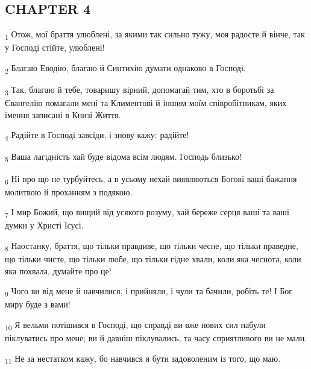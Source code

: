 \subsection{CHAPTER 4}
\begin{tcolorbox}
\textsubscript{1} Отож, мої браття улюблені, за якими так сильно тужу, моя радосте й вінче, так у Господі стійте, улюблені!
\end{tcolorbox}
\begin{tcolorbox}
\textsubscript{2} Благаю Еводію, благаю й Синтихію думати однаково в Господі.
\end{tcolorbox}
\begin{tcolorbox}
\textsubscript{3} Так, благаю й тебе, товаришу вірний, допомагай тим, хто в боротьбі за Євангелію помагали мені та Климентові й іншим моїм співробітникам, яких імення записані в Книзі Життя.
\end{tcolorbox}
\begin{tcolorbox}
\textsubscript{4} Радійте в Господі завсіди, і знову кажу: радійте!
\end{tcolorbox}
\begin{tcolorbox}
\textsubscript{5} Ваша лагідність хай буде відома всім людям. Господь близько!
\end{tcolorbox}
\begin{tcolorbox}
\textsubscript{6} Ні про що не турбуйтесь, а в усьому нехай виявляються Богові ваші бажання молитвою й проханням з подякою.
\end{tcolorbox}
\begin{tcolorbox}
\textsubscript{7} І мир Божий, що вищий від усякого розуму, хай береже серця ваші та ваші думки у Христі Ісусі.
\end{tcolorbox}
\begin{tcolorbox}
\textsubscript{8} Наостанку, браття, що тільки правдиве, що тільки чесне, що тільки праведне, що тільки чисте, що тільки любе, що тільки гідне хвали, коли яка чеснота, коли яка похвала, думайте про це!
\end{tcolorbox}
\begin{tcolorbox}
\textsubscript{9} Чого ви від мене й навчилися, і прийняли, і чули та бачили, робіть те! І Бог миру буде з вами!
\end{tcolorbox}
\begin{tcolorbox}
\textsubscript{10} Я вельми потішився в Господі, що справді ви вже нових сил набули піклуватись про мене; ви й давніш піклувались, та часу сприятливого ви не мали.
\end{tcolorbox}
\begin{tcolorbox}
\textsubscript{11} Не за нестатком кажу, бо навчився я бути задоволеним із того, що маю.
\end{tcolorbox}
